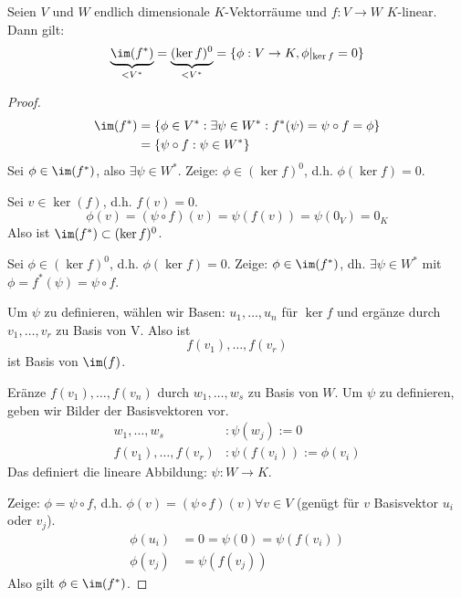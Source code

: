 \documentclass[a4paper, 10pt]{scrbook}
\begin{document}
\begin{prop}
\label{prop:9.13}
Seien $V$ und $W$ endlich dimensionale $K$-Vektorräume und $f:V\to W$ $K$-linear.
Dann gilt:
\[
\underbrace{\im(f^*)}_{< V^*}=\underbrace{(\ker f)^0}_{<V^*} =\{\phi:V\to K, \phi|_{\ker f}=0\}
\]
\begin{proof}
\begin{align*}
\im(f^*) &=\{\phi\in V^*:\exists \psi\in W^*:f^*(\psi)=\psi\circ f=\phi\}\\
&=\{\psi\circ f:\psi\in W^*\}
\end{align*}
Sei $\phi\in\im(f^*)$, also $\exists \psi\in W^*$.
Zeige: $\phi\in(\ker f)^0$, d.h. $\phi(\ker f)=0$.

Sei $v\in \ker(f)$, d.h. $f(v)=0$.
\[
\phi(v)=(\psi\circ f)(v)=\psi(f(v))=\psi(0_V)=0_K
\]
Also ist $\im(f^*)\subset (\ker f)^0$.

Sei $\phi\in (\ker f)^0$, d.h. $\phi(\ker f)=0$.
Zeige: $\phi\in\im(f^*)$, dh. $\exists\psi\in W^*$ mit $\phi=f^*(\psi)=\psi\circ f$.

\begin{center}
      \end{center}

Um $\psi$ zu definieren, wählen wir Basen: $u_1,\dotsc,u_n$ für $\ker f$ und ergänze durch $v_1,\dotsc,v_r$ zu Basis von V.
Also ist
\[
f(v_1),\dotsc,f(v_r)
\]
ist Basis von $\im(f)$.

Eränze $f(v_1),\dotsc,f(v_n)$ durch $w_1,\dotsc,w_s$ zu Basis von $W$.
Um $\psi$ zu definieren, geben wir Bilder der Basisvektoren vor.
\begin{align*}
w_1,\dotsc,w_s&:\psi(w_j):=0 \\
f(v_1),\dotsc,f(v_r)&:\psi(f(v_i)):=\phi(v_i)
\end{align*}
Das definiert die lineare Abbildung: $\psi: W\to K$.

Zeige: $\phi=\psi\circ f$, d.h. $\phi(v)=(\psi\circ f)(v)\forall v\in V$ (genügt für $v$ Basisvektor $u_i$ oder $v_j$).
\begin{align*}
\phi(u_i)&=0= \psi(0)=\psi(f(v_i))\\
\phi(v_j)&=\psi(f(v_j))
\end{align*}
Also gilt $\phi\in \im(f^*)$.
\end{proof}
\end{prop}
\end{document}
